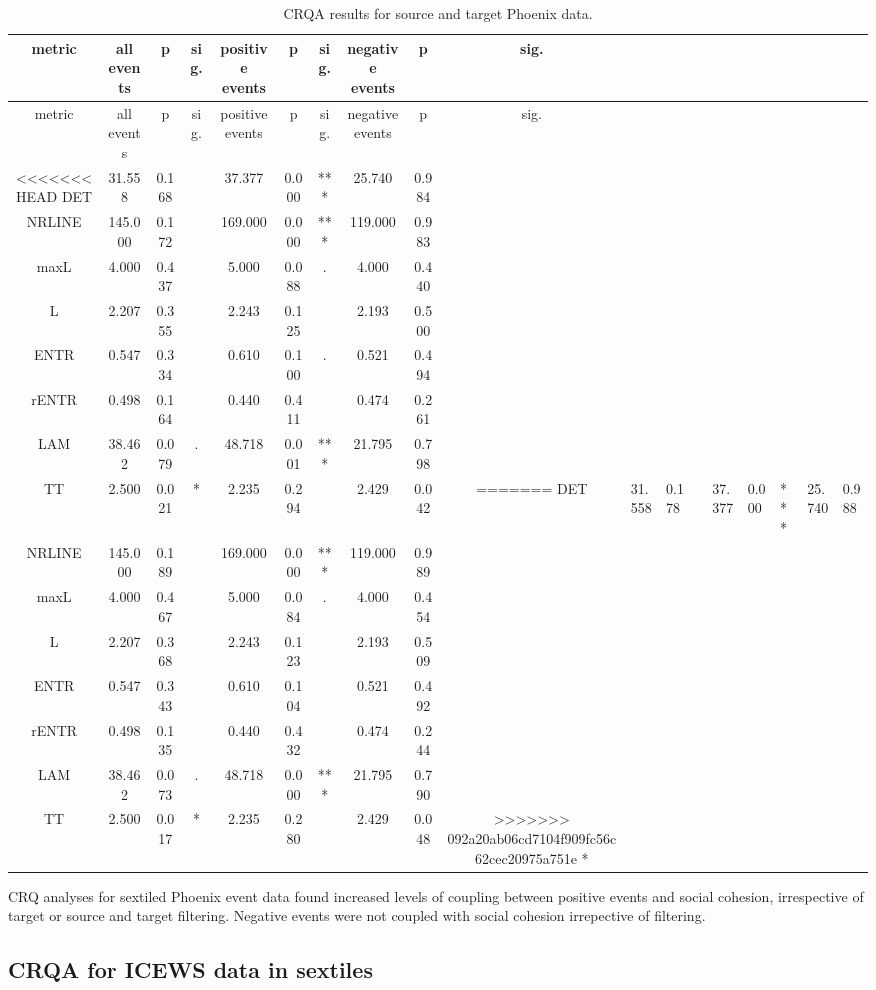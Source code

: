 \begin{appendix}
\begin{longtable}[]{@{}cccccccccc@{}}
\caption{CRQA results for source and target Phoenix
data.}\tabularnewline
\toprule
metric & all events & p & sig. & positive events & p & sig. & negative
events & p & sig.\tabularnewline
\midrule
\endfirsthead
\toprule
metric & all events & p & sig. & positive events & p & sig. & negative
events & p & sig.\tabularnewline
\midrule
\endhead
<<<<<<< HEAD
DET & 31.558 & 0.168 & & 37.377 & 0.000 & *** & 25.740 & 0.984
&\tabularnewline
NRLINE & 145.000 & 0.172 & & 169.000 & 0.000 & *** & 119.000 & 0.983
&\tabularnewline
maxL & 4.000 & 0.437 & & 5.000 & 0.088 & . & 4.000 & 0.440
&\tabularnewline
L & 2.207 & 0.355 & & 2.243 & 0.125 & & 2.193 & 0.500 &\tabularnewline
ENTR & 0.547 & 0.334 & & 0.610 & 0.100 & . & 0.521 & 0.494
&\tabularnewline
rENTR & 0.498 & 0.164 & & 0.440 & 0.411 & & 0.474 & 0.261
&\tabularnewline
LAM & 38.462 & 0.079 & . & 48.718 & 0.001 & *** & 21.795 & 0.798
&\tabularnewline
TT & 2.500 & 0.021 & * & 2.235 & 0.294 & & 2.429 & 0.042 &
=======
DET & 31.558 & 0.178 & & 37.377 & 0.000 & *** & 25.740 & 0.988
&\tabularnewline
NRLINE & 145.000 & 0.189 & & 169.000 & 0.000 & *** & 119.000 & 0.989
&\tabularnewline
maxL & 4.000 & 0.467 & & 5.000 & 0.084 & . & 4.000 & 0.454
&\tabularnewline
L & 2.207 & 0.368 & & 2.243 & 0.123 & & 2.193 & 0.509 &\tabularnewline
ENTR & 0.547 & 0.343 & & 0.610 & 0.104 & & 0.521 & 0.492
&\tabularnewline
rENTR & 0.498 & 0.135 & & 0.440 & 0.432 & & 0.474 & 0.244
&\tabularnewline
LAM & 38.462 & 0.073 & . & 48.718 & 0.000 & *** & 21.795 & 0.790
&\tabularnewline
TT & 2.500 & 0.017 & * & 2.235 & 0.280 & & 2.429 & 0.048 &
>>>>>>> 092a20ab06cd7104f909fc56c62cec20975a751e
*\tabularnewline
\bottomrule
\end{longtable}

CRQ analyses for sextiled Phoenix event data found increased levels of
coupling between positive events and social cohesion, irrespective of
target or source and target filtering. Negative events were not coupled
with social cohesion irrepective of filtering.

\hypertarget{crqa-for-icews-data-in-sextiles}{%
\subsection{CRQA for ICEWS data in
sextiles}\label{crqa-for-icews-data-in-sextiles}}


\end{appendix}
